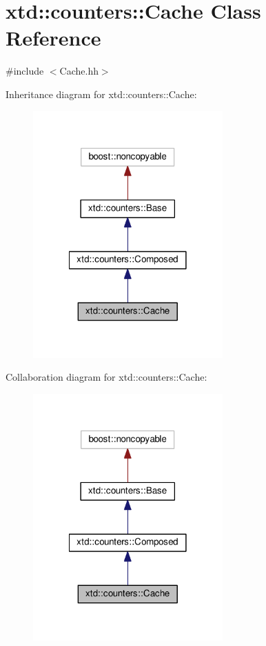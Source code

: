 \hypertarget{classxtd_1_1counters_1_1Cache}{\section{xtd\-:\-:counters\-:\-:Cache Class Reference}
\label{classxtd_1_1counters_1_1Cache}
}


{\ttfamily \#include $<$Cache.\-hh$>$}



Inheritance diagram for xtd\-:\-:counters\-:\-:Cache\-:
\nopagebreak
\begin{figure}[H]
\begin{center}
\leavevmode
\includegraphics[width=206pt]{classxtd_1_1counters_1_1Cache__inherit__graph}
\end{center}
\end{figure}


Collaboration diagram for xtd\-:\-:counters\-:\-:Cache\-:
\nopagebreak
\begin{figure}[H]
\begin{center}
\leavevmode
\includegraphics[width=206pt]{classxtd_1_1counters_1_1Cache__coll__graph}
\end{center}
\end{figure}

